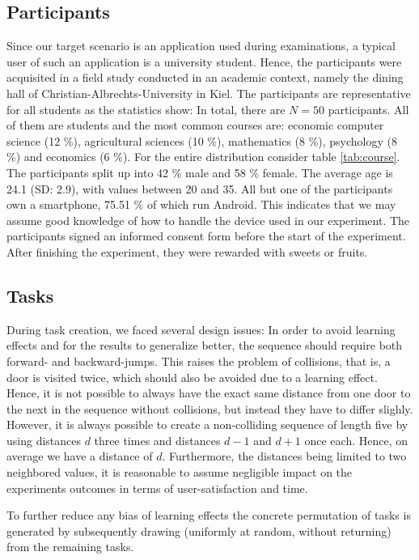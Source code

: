 \documentclass{sig-alternate-05-2015}
\begin{document}
\subsection{Participants}
Since our target scenario is an application used during examinations,
a typical user of such an application is a university student. Hence, the participants were acquisited in a field study conducted in an academic context, namely the dining hall of Christian-Albrechts-University in Kiel. The participants are representative for all students as the statistics show: In total, there are $N = 50$ participants. All of them are students and the most common courses are: economic computer science (12 \%), agricultural sciences (10 \%), mathematics (8 \%), psychology (8 \%) and economics (6 \%). For the entire distribution consider table \ref{tab:course}. The participants split up into 42 \% male and 58 \% female. The average age is 24.1 (SD: 2.9), 
with values between 20 and 35. 
All but one of the participants own a
smartphone, 75.51 \% of which run Android. This indicates that we may assume good knowledge
of how to handle the device used in our experiment.
The participants signed an informed consent form before the start of the experiment. After
finishing the experiment, they were rewarded with sweets or fruits.

\subsection{Tasks}
\label{sec:task}
During task creation, we faced several design issues: In order to avoid learning effects and for the results to generalize better, 
the sequence should require both forward- and backward-jumps. This raises the problem of collisions, that is, a door is visited twice, which
should also be avoided due to a learning effect. Hence, it is not possible to always have the exact same distance from one door to the
next in the sequence without collisions, but instead they have to differ slighly. However, it is always possible to create a non-colliding sequence of
length five by using distances $d$ three times and distances $d - 1$ and $d + 1$ once each. Hence, on average we have a distance of $d$. 
Furthermore, the distances being limited to two neighbored values, it is reasonable to assume negligible
impact on the experiments outcomes in terms of user-satisfaction and time.

To further reduce any bias of learning effects
the concrete permutation of tasks is generated by subsequently drawing
(uniformly at random, without returning) from the remaining tasks.
\end{document}
